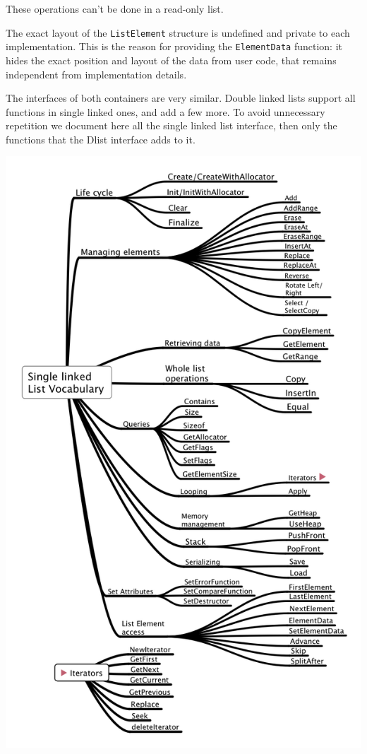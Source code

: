 \documentclass[12pt,a4paper]{memoir} %
\begin{document}
These operations can't be done in a read-only list.

The exact layout of the \verb,ListElement, structure is undefined and private to each implementation. This is the reason for providing the \verb,ElementData, function: it hides the exact position and layout of the data from user code, that remains independent from implementation details.

The interfaces of both containers are very similar. Double linked lists support all functions in single linked ones, and add a few more. To avoid unnecessary repetition we document here all the single linked list interface, then only the functions that the Dlist interface adds to it.

\par\noindent
\includegraphics[scale=0.45]{ListVocabulary.png}
\end{document}
